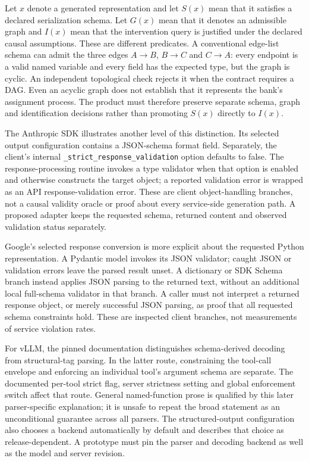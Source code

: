 Let $x$ denote a generated representation and let $S(x)$ mean that it satisfies
a declared serialization schema. Let $G(x)$ mean that it denotes an admissible
graph and $I(x)$ mean that the intervention query is justified under the
declared causal assumptions. These are different predicates. A conventional
edge-list schema can admit the three edges $A\to B$, $B\to C$ and $C\to A$:
every endpoint is a valid named variable and every field has the expected
type, but the graph is cyclic. An independent topological check rejects it
when the contract requires a DAG. Even an acyclic graph does not establish
that it represents the bank's assignment process. The product must therefore
preserve separate schema, graph and identification decisions rather than
promoting $S(x)$ directly to $I(x)$.
\citep{exec24_backend_reference}

The Anthropic SDK illustrates another level of this distinction. Its selected
output configuration contains a JSON-schema format field. Separately, the
client's internal \texttt{\_strict\_response\_validation} option defaults to
false. The response-processing routine invokes a type validator when that
option is enabled and otherwise constructs the target object; a reported
validation error is wrapped as an API response-validation error. These are
client object-handling branches, not a causal validity oracle or proof about
every service-side generation path. A proposed adapter keeps the requested
schema, returned content and observed validation status separately.
\citep{exec24_backend_anthropic}

Google's selected response conversion is more explicit about the requested
Python representation. A Pydantic model invokes its JSON validator; caught
JSON or validation errors leave the parsed result unset. A dictionary or
SDK Schema branch instead applies JSON parsing to the returned text, without
an additional local full-schema validator in that branch. A caller must
not interpret a returned response object, or merely successful JSON parsing,
as proof that all requested schema constraints hold. These are inspected
client branches, not measurements of service violation rates.
\citep{exec24_backend_google}

For vLLM, the pinned documentation distinguishes schema-derived decoding
from structural-tag parsing. In the latter route, constraining the tool-call
envelope and enforcing an individual tool's argument schema are separate.
The documented per-tool strict flag, server strictness setting and global
enforcement switch affect that route. General named-function prose is
qualified by this later parser-specific explanation; it is unsafe to repeat
the broad statement as an unconditional guarantee across all parsers.
The structured-output configuration also chooses a backend automatically
by default and describes that choice as release-dependent. A prototype must
pin the parser and decoding backend as well as the model and server revision.
\citep{exec24_backend_vllm}

